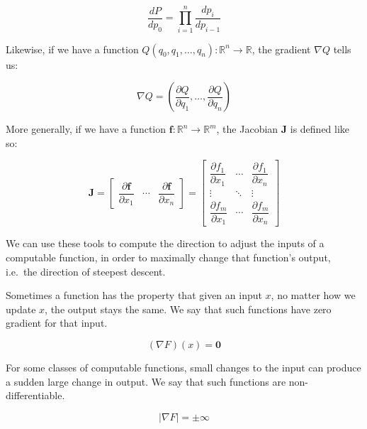 \documentclass[12pt,initial,twoside,maitrise]{dms}
\numberwithin{equation}{section}
\numberwithin{table}{chapter}
\numberwithin{figure}{chapter}
\begin{document}
%
\begin{equation}
    \frac{dP}{dp_0} = {\displaystyle \prod_{i=1}^{n} \frac{dp_{i}}{dp_{i-1}}}
\end{equation}

\noindent Likewise, if we have a function $Q(q_0, q_1, \dots, q_n):  \mathbb{R}^n\rightarrow\mathbb{R}$, the gradient $\nabla Q$ tells us:

\begin{equation}
    \nabla Q = \left( \frac{\partial Q}{\partial q_1}, \dots, \frac{\partial Q}{\partial q_n}\right)
\end{equation}

\noindent More generally, if we have a function $\mathbf{f}:  \mathbb{R}^n\rightarrow\mathbb{R}^m$, the Jacobian $\mathbf J$ is defined like so:

\begin{equation}
\mathbf J = \begin{bmatrix}
                       \dfrac{\partial \mathbf{f}}{\partial x_1} & \cdots & \dfrac{\partial \mathbf{f}}{\partial x_n} \end{bmatrix}
= \begin{bmatrix}
      \dfrac{\partial f_1}{\partial x_1} & \cdots & \dfrac{\partial f_1}{\partial x_n}\\
      \vdots & \ddots & \vdots\\
      \dfrac{\partial f_m}{\partial x_1} & \cdots & \dfrac{\partial f_m}{\partial x_n} \end{bmatrix}
\end{equation}

\noindent We can use these tools to compute the direction to adjust the inputs of a computable function, in order to maximally change that function's output, i.e.\ the direction of steepest descent.

Sometimes a function has the property that given an input $x$, no matter how we update $x$, the output stays the same. We say that such functions have zero gradient for that input.

\begin{equation}
    (\nabla F)(x) = \mathbf{0}
\end{equation}

For some classes of computable functions, small changes to the input can produce a sudden large change in output. We say that such functions are non-differentiable.

\begin{equation}
    |\nabla F| = \pm \infty
\end{equation}
\end{document}
